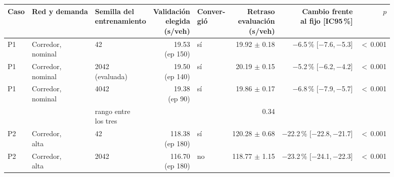 \begin{table}[H]
\centering
\scriptsize
\setlength{\tabcolsep}{3pt}
\begin{tabular}{lllrlrrr}
\toprule
Caso & Red y demanda & \makecell{Semilla del\\entrenamiento} & \makecell{Validación\\elegida\\(s/veh)} & \makecell{Conver-\\gió} & \makecell{Retraso\\evaluación\\(s/veh)} & \makecell{Cambio frente\\al fijo [IC95\,\%]} & $p$ \\
\midrule
P1 & \makecell[l]{Corredor,\\{}nominal} & 42 & \makecell[r]{19.53\\{}(ep 150)} & sí & \makecell[r]{19.92\\{}$\pm$ 0.18} & \makecell[r]{$-$6.5\,\%\\{}[$-$7.6,\,$-$5.3]} & $<$\,0.001 \\
P1 & \makecell[l]{Corredor,\\{}nominal} & \makecell[l]{2042\\{}(evaluada)} & \makecell[r]{19.50\\{}(ep 140)} & sí & \makecell[r]{20.19\\{}$\pm$ 0.15} & \makecell[r]{$-$5.2\,\%\\{}[$-$6.2,\,$-$4.2]} & $<$\,0.001 \\
P1 & \makecell[l]{Corredor,\\{}nominal} & 4042 & \makecell[r]{19.38\\{}(ep 90)} & sí & \makecell[r]{19.86\\{}$\pm$ 0.17} & \makecell[r]{$-$6.8\,\%\\{}[$-$7.9,\,$-$5.7]} & $<$\,0.001 \\
 & & \makecell[l]{rango entre\\{}los tres} & & & 0.34 & & \\
P2 & \makecell[l]{Corredor,\\{}alta} & 42 & \makecell[r]{118.38\\{}(ep 180)} & sí & \makecell[r]{120.28\\{}$\pm$ 0.68} & \makecell[r]{$-$22.2\,\%\\{}[$-$22.8,\,$-$21.7]} & $<$\,0.001 \\
P2 & \makecell[l]{Corredor,\\{}alta} & 2042 & \makecell[r]{116.70\\{}(ep 180)} & no & \makecell[r]{118.77\\{}$\pm$ 1.15} & \makecell[r]{$-$23.2\,\%\\{}[$-$24.1,\,$-$22.3]} & $<$\,0.001 \\

\end{tabular}
\end{table}
